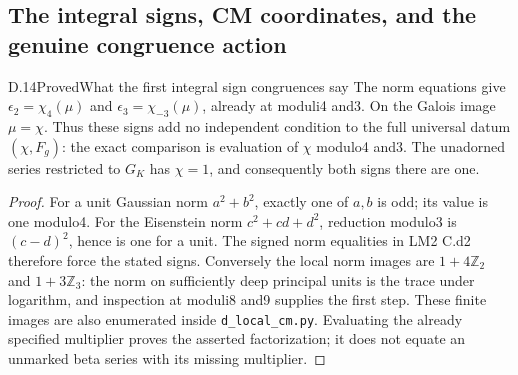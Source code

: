 \subsection{The integral signs, CM coordinates, and the genuine congruence action}

\begin{statement}{D.14}{Proved}{What the first integral sign congruences say}
The norm equations give $\epsilon_2=\chi_4(\mu)$ and $\epsilon_3=\chi_{-3}(\mu)$, already at moduli4 and3. On the Galois image $\mu=\chi$. Thus these signs add no independent condition to the full universal datum $(\chi,F_g)$: the exact comparison is evaluation of $\chi$ modulo4 and3. The unadorned series restricted to $G_K$ has $\chi=1$, and consequently both signs there are one.
\end{statement}
\begin{proof}
For a unit Gaussian norm $a^2+b^2$, exactly one of $a,b$ is odd; its value is one modulo4. For the Eisenstein norm $c^2+cd+d^2$, reduction modulo3 is $(c-d)^2$, hence is one for a unit. The signed norm equalities in LM2 C.d2 therefore force the stated signs. Conversely the local norm images are $1+4\mathbb Z_2$ and $1+3\mathbb Z_3$: the norm on sufficiently deep principal units is the trace under logarithm, and inspection at moduli8 and9 supplies the first step. These finite images are also enumerated inside \texttt{d\_local\_cm.py}. Evaluating the already specified multiplier proves the asserted factorization; it does not equate an unmarked beta series with its missing multiplier.
\end{proof}

